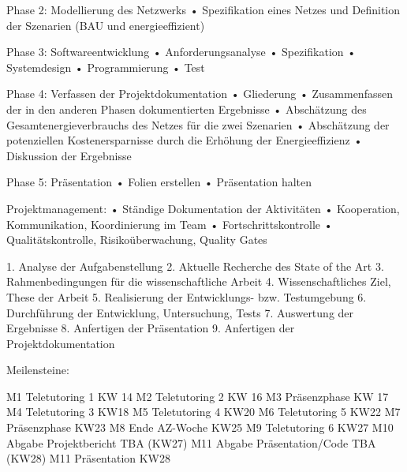 \documentclass[12pt,titlepage]{article}
\begin{document}
Phase 2: Modellierung des Netzwerks
•	Spezifikation eines Netzes und Definition der Szenarien (BAU und energieeffizient)
 
Phase 3: Softwareentwicklung
•	Anforderungsanalyse
•	Spezifikation
•	Systemdesign
•	Programmierung
•	Test
 
Phase 4: Verfassen der Projektdokumentation
•	Gliederung
•	Zusammenfassen der in den anderen Phasen dokumentierten Ergebnisse
•	Abschätzung des Gesamtenergieverbrauchs des Netzes für die zwei Szenarien
•	Abschätzung der potenziellen Kostenersparnisse durch die Erhöhung der Energieeffizienz
•	Diskussion der Ergebnisse
 
Phase 5: Präsentation
•	Folien erstellen
•	Präsentation halten
 
 
 
Projektmanagement:
•	Ständige Dokumentation der Aktivitäten
•	Kooperation, Kommunikation, Koordinierung im Team
•	Fortschrittskontrolle
•	Qualitätskontrolle, Risikoüberwachung, Quality Gates
 
 
 
1. Analyse der Aufgabenstellung
2. Aktuelle Recherche des State of the Art
3. Rahmenbedingungen für die wissenschaftliche Arbeit
4. Wissenschaftliches Ziel, These der Arbeit
5. Realisierung der Entwicklungs- bzw. Testumgebung
6. Durchführung der Entwicklung, Untersuchung, Tests
7. Auswertung der Ergebnisse
8. Anfertigen der Präsentation
9. Anfertigen der Projektdokumentation
 
Meilensteine:
 
M1 Teletutoring 1	KW 14
M2 Teletutoring 2	KW 16
M3 Präsenzphase	KW 17
M4 Teletutoring 3	KW18
M5 Teletutoring 4	KW20
M6 Teletutoring 5	KW22
M7 Präsenzphase	KW23
M8 Ende AZ-Woche	KW25
M9 Teletutoring 6	KW27
M10 Abgabe Projektbericht	TBA (KW27)
M11 Abgabe Präsentation/Code	TBA (KW28)
M11 Präsentation	KW28
 
 
\end{document}
